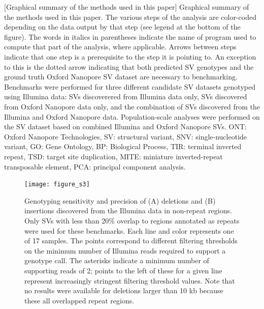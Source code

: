 \documentclass[12pt]{article}
\newenvironment{cfigure}
	{\begin{figure} \centering}
	{\end{figure}}
\begin{document}
	[Graphical summary of the methods used in this paper]{
		Graphical summary of the methods used in this paper.
		The various steps of the analysis are color-coded depending on the data output by that step (see legend at the bottom of the figure).
		The words in italics in parentheses indicate the name of program used to compute that part of the analysis, where applicable.
		Arrows between steps indicate that one step is a prerequisite to the step it is pointing to.
		An exception to this is the dotted arrow indicating that both predicted SV genotypes and the ground truth Oxford Nanopore SV dataset are necessary to benchmarking.
		Benchmarks were performed for three different candidate SV datasets genotyped using Illumina data: SVs discoverered from Illumina data only, SVs discovered from Oxford Nanopore data only, and the combination of SVs discovered from the Illumina and Oxford Nanopore data.
	Population-scale analyses were performed on the SV dataset based on combined Illumina and Oxford Nanopore SVs.
	ONT: Oxford Nanopore Technologies, SV: structural variant, SNV: single-nucleotide variant, GO: Gene Ontology, BP: Biological Process, TIR: terminal inverted repeat, TSD: target site duplication, MITE: miniature inverted-repeat transposable element, PCA: principal component analysis.
}

\clearpage%

\begin{cfigure}
	\texttt{[image: figure\_s3]}

	\caption[Sensitivity and precision of Illumina deletion and insertion genotyping in non-repeat regions]{
		Genotyping sensitivity and precision of (A) deletions and (B) insertions discovered from the Illumina data in non-repeat regions. 
		Only SVs with less than 20\% overlap to regions annotated as repeats were used for these benchmarks. 
		Each line and color represents one of 17 samples. 
		The points correspond to different filtering thresholds on the minimum number of Illumina reads required to support a genotype call.
		The asterisks indicate a minimum number of supporting reads of 2; points to the left of these for a given line represent increasingly stringent filtering threshold values.
		Note that no results were available for deletions larger than 10 kb because these all overlapped repeat regions.
	}

	\label{fig_s3}

\end{cfigure}
\end{document}
